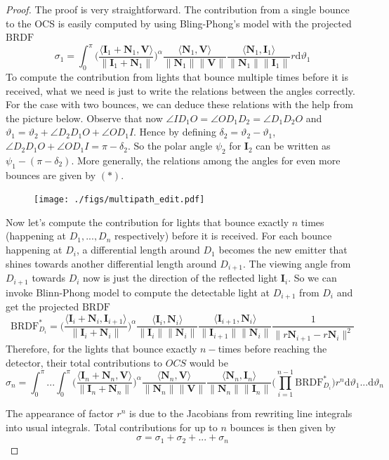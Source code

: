 \documentclass[11pt]{amsart}
\newcommand{\BRDF}{\mathrm{BRDF}}
\newcommand{\ip}[2]{\langle {#1}, {#2} \rangle}
\theoremstyle{definition}
\begin{document}
\begin{proof}
The proof is very straightforward. The contribution from a single bounce to the OCS is easily computed by using Bling-Phong's model with the projected $\BRDF$
$$\sigma_1 =\int_{0}^{\pi}\Bigg(\frac{\ip{\mathbf{I}_1+\mathbf{N}_1}{\mathbf{V}}}{\|\mathbf{I}_1+\mathbf{N}_1\|}\Bigg)^\alpha\frac{\ip{\mathbf{N}_1}{\mathbf{V}}}{\|\mathbf{N}_1\| \|\mathbf{V}\|}\frac{\ip{\mathbf{N}_1}{\mathbf{I}_1}}{\|\mathbf{N}_1\| \|\mathbf{I}_1\|} r\mathrm{d}\vartheta_1$$
To compute the contribution from lights that bounce multiple times before it is received, what we need is just to write the relations between the angles correctly. For the case with two bounces, we can deduce these relations with the help from the picture below. Observe that now
$\angle{ID_1O}=\angle{OD_1D_2}=\angle{D_1D_2O}$ and $\vartheta_1=\vartheta_2+\angle{D_2D_1O}+\angle{OD_1I}$. Hence by defining $\delta_2=\vartheta_2-\vartheta_1$, $\angle{D_2D_1O}+\angle{OD_1I}=\pi-\delta_2$. So the polar angle $\psi_2$ for $\mathbf{I}_2$ can be written as $\psi_1-(\pi-\delta_2)$.  More generally,  the relations among the angles for even more bounces are given by  $(*)$.
\begin{figure}[H]
  \texttt{[image: ./figs/multipath\_edit.pdf]}
  \label{fig:reflection}
\end{figure}

Now let's compute the contribution for lights that bounce exactly $n$ times (happening at $D_1,...,D_n$ respectively) before it is received. For each bounce happening at $D_i$, a differential length around $D_1$ becomes the new emitter that shines towards another differential length around $D_{i+1}$. The viewing angle from $D_{i+1}$ towards $D_i$ now is just the direction of the reflected light $\mathbf{I}_{i}$. So we can invoke Blinn-Phong model to compute the detectable light at $D_{i+1}$ from $D_i$ and get the projected $\BRDF$
$$\BRDF^*_{D_i}=\Bigg(\frac{\ip{\mathbf{I}_i+\mathbf{N}_i}{\mathbf{I}_{i+1}}}{\|\mathbf{I}_i+\mathbf{N}_i\|}\Bigg)^\alpha\frac{\ip{\mathbf{I}_i}{\mathbf{N}_i}}{\|\mathbf{I}_i\|\|\mathbf{N}_i\|}\frac{\ip{\mathbf{I}_{i+1}}{\mathbf{N}_i}}{\|\mathbf{I}_{i+1}\|\|\mathbf{N}_i\|} \frac{1}{\|r\mathbf{N}_{i+1}-r\mathbf{N}_i\|^2}$$
Therefore, for the lights that bounce exactly $n-$times before reaching the detector, their total contributions to $OCS$ would be 
\begin{equation*}
\sigma_n =\int_{0}^{\pi}...\int_{0}^{\pi}\Bigg(\frac{\ip{\mathbf{I}_n+\mathbf{N}_n}{\mathbf{V}}}{\|\mathbf{I}_n+\mathbf{N}_n\|}\Bigg)^\alpha\frac{\ip{\mathbf{N}_n}{\mathbf{V}}}{\|\mathbf{N}_n\| \|\mathbf{V}\|}\frac{\ip{\mathbf{N}_n}{\mathbf{I}_n}}{\|\mathbf{N}_n\| \|\mathbf{I}_n\|} \bigg(\prod_{i=1}^{n-1}\BRDF^*_{D_i}\bigg) r^n\mathrm{d}\vartheta_1...\mathrm{d}\vartheta_n
\end{equation*}

The appearance of factor $r^n$ is due to the Jacobians from rewriting line integrals into usual integrals. Total contributions for up to $n$ bounces is then given by
 $$ \sigma= \sigma_1+\sigma_2+...+\sigma_n$$
 \end{proof}
 
\end{document}
